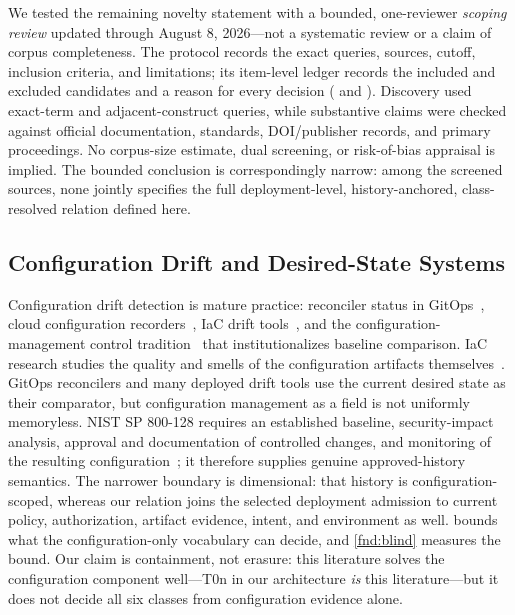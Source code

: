 We tested the remaining novelty statement with a bounded, one-reviewer
\emph{scoping review} updated through August 8, 2026---not a systematic review
or a claim of corpus completeness. The protocol records the exact queries,
sources, cutoff, inclusion criteria, and limitations; its item-level ledger
records the included and excluded candidates and a reason for every decision
( and
). Discovery used exact-term
and adjacent-construct queries, while substantive claims were checked against
official documentation, standards, DOI/publisher records, and primary
proceedings. No corpus-size estimate, dual screening, or risk-of-bias appraisal
is implied. The bounded conclusion is correspondingly narrow: among the
screened sources, none jointly specifies the full deployment-level,
history-anchored, class-resolved relation defined here.

\subsection{Configuration Drift and Desired-State Systems}
Configuration drift detection is mature practice: reconciler status in
GitOps~\cite{argocd,fluxcd,opengitops,beetz2022}, cloud configuration
recorders~\cite{awsconfig}, IaC drift tools~\cite{driftctl}, and the
configuration-management control tradition~\cite{nist800128,nist80053} that
institutionalizes baseline comparison. IaC research studies the quality and
smells of the configuration artifacts themselves~\cite{rahman2019mapping,
rahman2019,sharma2016}. GitOps reconcilers and many deployed drift tools use
the current desired state as their comparator, but configuration management as
a field is not uniformly memoryless. NIST SP 800-128 requires an established
baseline, security-impact analysis, approval and documentation of controlled
changes, and monitoring of the resulting configuration~\cite{nist800128}; it
therefore supplies genuine approved-history semantics. The narrower boundary
is dimensional: that history is configuration-scoped, whereas our relation
joins the selected deployment admission to current policy, authorization,
artifact evidence, intent, and environment as well. 
bounds what the configuration-only vocabulary can decide, and
\cref{fnd:blind} measures the bound. Our claim is containment, not erasure:
this literature solves the configuration component well---T0n in our
architecture \emph{is} this literature---but it does not decide all six
classes from configuration evidence alone.

